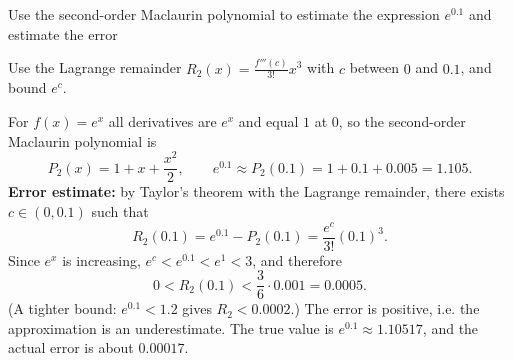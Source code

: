 
\begin{question}
Use the second-order Maclaurin polynomial to estimate the expression $e^{0.1}$ and estimate the error
\end{question}

\begin{hint}
Use the Lagrange remainder $R_2(x)=\frac{f'''(c)}{3!}x^3$ with $c$ between $0$ and $0.1$, and bound $e^c$.
\end{hint}

\begin{solution}
For $f(x)=e^x$ all derivatives are $e^x$ and equal $1$ at $0$, so the second-order Maclaurin polynomial is
\[ P_2(x)=1+x+\frac{x^2}{2}, \qquad e^{0.1}\approx P_2(0.1)=1+0.1+0.005=\boxed{1.105}. \]
\textbf{Error estimate:} by Taylor's theorem with the Lagrange remainder, there exists $c\in(0,0.1)$ such that
\[ R_2(0.1)=e^{0.1}-P_2(0.1)=\frac{e^{c}}{3!}(0.1)^3. \]
Since $e^x$ is increasing, $e^c<e^{0.1}<e^1<3$, and therefore
\[ 0<R_2(0.1)<\frac{3}{6}\cdot 0.001=0.0005. \]
(A tighter bound: $e^{0.1}<1.2$ gives $R_2<0.0002$.) The error is positive, i.e. the approximation is an underestimate. The true value is $e^{0.1}\approx 1.10517$, and the actual error is about $0.00017$.
\end{solution}
